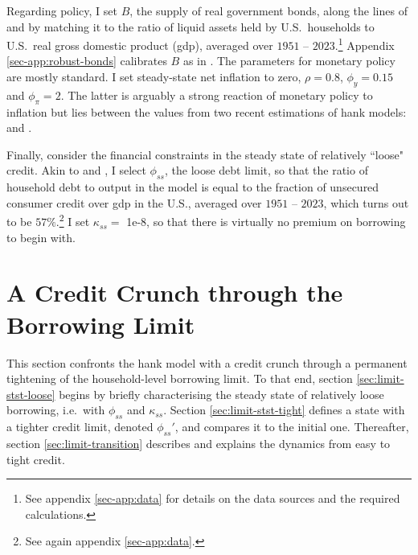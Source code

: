 \documentclass[a4paper,12pt]{article} %
\numberwithin{equation}{section} %
\numberwithin{figure}{section}
\numberwithin{table}{section}
\begin{document}
Regarding policy, I set $B$, the supply of real government bonds, along the lines of \textcite{mckay2016} and \textcite{gl2017} by matching it to the ratio of liquid assets held by U.S.~households to U.S.~real gross domestic product (\Gls{gdp}), averaged over $1951$ -- $2023$.\footnote{See appendix \ref{sec-app:data} for details on the data sources and the required calculations.} Appendix \ref{sec-app:robust-bonds} calibrates $B$ as in \textcite{bayer2023}. The parameters for monetary policy are mostly standard. I set steady-state net inflation to zero, $\rho = 0.8$, $\phi_y = 0.15$ and $\phi_{\pi} = 2$. The latter is arguably a strong reaction of monetary policy to inflation but lies between the values from two recent estimations of \Gls{hank} models: \textcite{boehl2022} and \textcite{bayer2023}.

Finally, consider the financial constraints in the steady state of relatively ``loose" credit. Akin to \textcite{gl2017} and \textcite{bayer2023}, I select $\phi_{ss}$, the loose debt limit, so that the ratio of household debt to output in the model is equal to the fraction of unsecured consumer credit over \Gls{gdp} in the U.S., averaged over $1951$ -- $2023$, which turns out to be $57\%$.\footnote{See again appendix \ref{sec-app:data}.} I set $\kappa_{ss} =$ 1e-8, so that there is virtually no premium on borrowing to begin with.

\section{A Credit Crunch through the Borrowing Limit}
\label{sec:limit}

This section confronts the \Gls{hank} model with a credit crunch through a permanent tightening of the household-level borrowing limit. To that end, section \ref{sec:limit-stst-loose} begins by briefly characterising the steady state of relatively loose borrowing, i.e.~with $\phi_{ss}$ and $\kappa_{ss}$. Section \ref{sec:limit-stst-tight} defines a state with a tighter credit limit, denoted $\phi_{ss}'$, and compares it to the initial one. Thereafter, section \ref{sec:limit-transition} describes and explains the dynamics from easy to tight credit.

\end{document}
